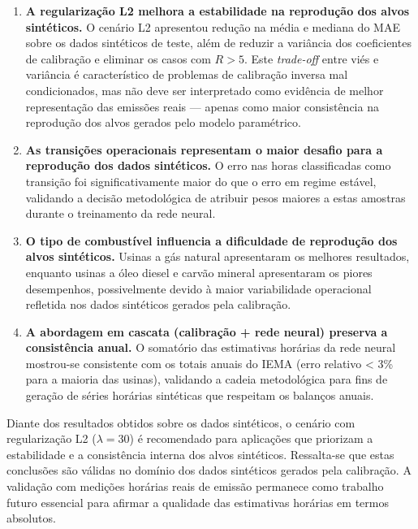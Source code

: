 \begin{enumerate}
    \item \textbf{A regularização L2 melhora a estabilidade na reprodução dos alvos sintéticos.} 
    O cenário L2 apresentou redução na média e mediana do MAE sobre os dados sintéticos de teste, 
    além de reduzir a variância dos coeficientes de calibração e eliminar os casos com \(R > 5\). 
    Este \textit{trade-off} entre viés e variância é característico de problemas de calibração inversa 
    mal condicionados, mas não deve ser interpretado como evidência de melhor representação das 
    emissões reais — apenas como maior consistência na reprodução dos alvos gerados pelo modelo 
    paramétrico.

    \item \textbf{As transições operacionais representam o maior desafio para a reprodução dos dados sintéticos.} 
    O erro nas horas classificadas como transição foi significativamente maior do que o erro em 
    regime estável, validando a decisão metodológica de atribuir pesos maiores a estas amostras 
    durante o treinamento da rede neural.

    \item \textbf{O tipo de combustível influencia a dificuldade de reprodução dos alvos sintéticos.} 
    Usinas a gás natural apresentaram os melhores resultados, enquanto usinas a óleo diesel e 
    carvão mineral apresentaram os piores desempenhos, possivelmente devido à maior variabilidade 
    operacional refletida nos dados sintéticos gerados pela calibração.

    \item \textbf{A abordagem em cascata (calibração + rede neural) preserva a consistência anual.} 
    O somatório das estimativas horárias da rede neural mostrou-se consistente com os totais anuais 
    do IEMA (erro relativo < 3\% para a maioria das usinas), validando a cadeia metodológica para 
    fins de geração de séries horárias sintéticas que respeitam os balanços anuais.
\end{enumerate}

Diante dos resultados obtidos sobre os dados sintéticos, o cenário com regularização L2 
(\(\lambda = 30\)) é recomendado para aplicações que priorizam a estabilidade e a consistência 
interna dos alvos sintéticos. Ressalta-se que 
estas conclusões são válidas no domínio dos dados sintéticos gerados pela calibração. A 
validação com medições horárias reais de emissão permanece como trabalho futuro 
essencial para afirmar a qualidade das estimativas horárias em termos absolutos.

